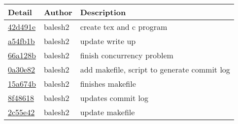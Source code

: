 \begin{tabular}{l l l}\textbf{Detail} & \textbf{Author} & \textbf{Description}\\\hline
\href{https://github.com/balesh2/CS444-write-up-1/commit/42d491ee4c85c1fb33946119ef4ccd85bc7a22d9}{42d491e} & balesh2 & create tex and c program\\\hline
\href{https://github.com/balesh2/CS444-write-up-1/commit/a54fb1bd1cbc1bba8d00c19603d0c71cd2b341ce}{a54fb1b} & balesh2 & update write up\\\hline
\href{https://github.com/balesh2/CS444-write-up-1/commit/66a128b6cb787630ca5ee018be159e8916a0d639}{66a128b} & balesh2 & finish concurrency problem\\\hline
\href{https://github.com/balesh2/CS444-write-up-1/commit/0a30e82f7164fd99630aa3bc042ef80799391d23}{0a30e82} & balesh2 & add makefile, script to generate commit log\\\hline
\href{https://github.com/balesh2/CS444-write-up-1/commit/15a674b748965d1b7e9fb3f91cc396f0b858b991}{15a674b} & balesh2 & finishes makefile\\\hline
\href{https://github.com/balesh2/CS444-write-up-1/commit/8f486187f63e041b5ab9d1912ca149940b585dc7}{8f48618} & balesh2 & updates commit log\\\hline
\href{https://github.com/balesh2/CS444-write-up-1/commit/2c55e427910e12c9c37a1c0a8d59a05bddd97c35}{2c55e42} & balesh2 & update makefile\\\hline\end{tabular}
